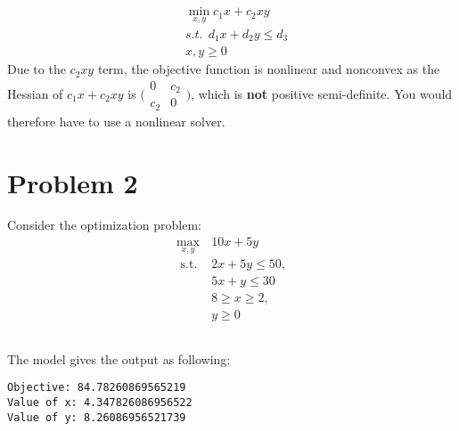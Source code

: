 \documentclass[english]{article}
\begin{document}
 \subsection{}
     \begin{align*}
     & \min_{x, y} c_1 x + c_2 xy\\ 
     & s.t. \ \ d_1 x + d_2 y \leq d_3 \\
      & x,y \geq 0
     \end{align*} 
    Due to the $c_2 x y$ term, the objective function is nonlinear and nonconvex as the Hessian of $c_1x + c_2 xy$ is 
    $\big(\begin{smallmatrix}
      0 & c_2\\
      c_2 & 0
    \end{smallmatrix}\big)$, which is \textbf{not} positive semi-definite.
    You would therefore have to use a nonlinear solver. 

\section{Problem 2}
Consider the optimization problem:
$$
\begin{array}{ll}
\max _{x, y} & 10 x+5 y \\
\text { s.t. } & 2 x+5 y \leq 50, \\
& 5 x+y \leq 30 \\
& 8 \geq x \geq 2, \\
& y \geq 0
\end{array}
$$
\subsection{}
The model gives the output as following:
\begin{verbatim}
Objective: 84.78260869565219
Value of x: 4.347826086956522
Value of y: 8.26086956521739
\end{verbatim}
\end{document}

